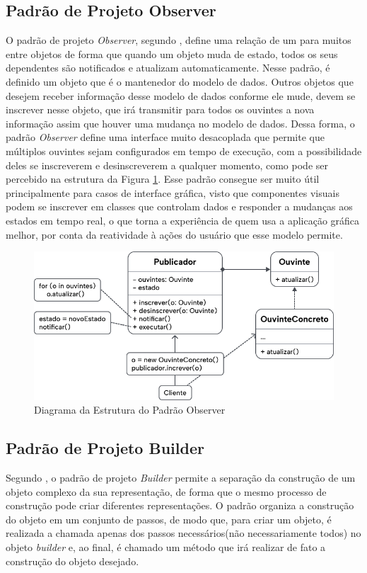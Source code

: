 \documentclass[12pt, %
openright, 
oneside, %
a4paper,    %
brazil]{facom-ufu-abntex2}
\begin{document}
\subsection{Padrão de Projeto Observer}

O padrão de projeto \textit{Observer}, segundo , define uma relação de um para muitos entre objetos de forma que quando um objeto muda de estado, todos os seus dependentes são notificados e atualizam automaticamente. Nesse padrão, é definido um objeto que é o mantenedor do modelo de dados. Outros objetos que desejem receber informação desse modelo de dados conforme ele mude, devem se inscrever nesse objeto, que irá transmitir para todos os ouvintes a nova informação assim que houver uma mudança no modelo de dados. Dessa forma, o padrão \textit{Observer} define uma interface muito desacoplada que permite que múltiplos ouvintes sejam configurados em tempo de execução, com a possibilidade deles se inscreverem e desinscreverem a qualquer momento, como pode ser percebido na estrutura da Figura \ref{fig:observer_diagram}. Esse padrão consegue ser muito útil principalmente para casos de interface gráfica, visto que componentes visuais podem se inscrever em classes que controlam dados e responder a mudanças aos estados em tempo real, o que torna a experiência de quem usa a aplicação gráfica melhor, por conta da reatividade à ações do usuário que esse modelo permite.

\begin{figure}[ht]
    \centering
    \includegraphics[width=.65\textwidth]{figures/bibliographical_review/observer_diagram.png}
    \caption{Diagrama da Estrutura do Padrão Observer}
    \label{fig:observer_diagram}
\end{figure}

\subsection{Padrão de Projeto Builder}

Segundo , o padrão de projeto \textit{Builder} permite a separação da construção de um objeto complexo da sua representação, de forma que o mesmo processo de construção pode criar diferentes representações. O padrão organiza a construção do objeto em um conjunto de passos, de modo que, para criar um objeto, é realizada a chamada apenas dos passos necessários(não necessariamente todos) no objeto \textit{builder} e, ao final, é chamado um método que irá realizar de fato a construção do objeto desejado.
\end{document}
